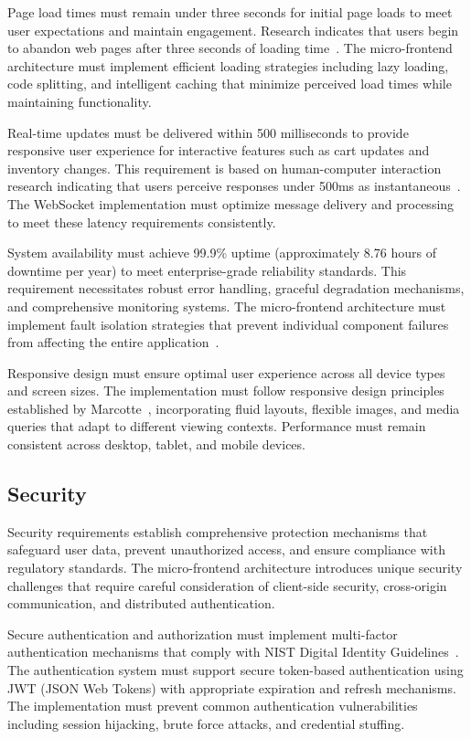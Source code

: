 \documentclass[12pt,a4paper]{report}
\begin{document}
Page load times must remain under three seconds for initial page loads to meet user expectations and maintain engagement. Research indicates that users begin to abandon web pages after three seconds of loading time~\cite{nielsen2012ecommerce}. The micro-frontend architecture must implement efficient loading strategies including lazy loading, code splitting, and intelligent caching that minimize perceived load times while maintaining functionality.

Real-time updates must be delivered within 500 milliseconds to provide responsive user experience for interactive features such as cart updates and inventory changes. This requirement is based on human-computer interaction research indicating that users perceive responses under 500ms as instantaneous~\cite{miller1968response}. The WebSocket implementation must optimize message delivery and processing to meet these latency requirements consistently.

System availability must achieve 99.9\% uptime (approximately 8.76 hours of downtime per year) to meet enterprise-grade reliability standards. This requirement necessitates robust error handling, graceful degradation mechanisms, and comprehensive monitoring systems. The micro-frontend architecture must implement fault isolation strategies that prevent individual component failures from affecting the entire application~\cite{avizienis2004basic}.

Responsive design must ensure optimal user experience across all device types and screen sizes. The implementation must follow responsive design principles established by Marcotte~\cite{marcotte2010responsive}, incorporating fluid layouts, flexible images, and media queries that adapt to different viewing contexts. Performance must remain consistent across desktop, tablet, and mobile devices.

\subsection{Security}

Security requirements establish comprehensive protection mechanisms that safeguard user data, prevent unauthorized access, and ensure compliance with regulatory standards. The micro-frontend architecture introduces unique security challenges that require careful consideration of client-side security, cross-origin communication, and distributed authentication.

Secure authentication and authorization must implement multi-factor authentication mechanisms that comply with NIST Digital Identity Guidelines~\cite{nist2017digital}. The authentication system must support secure token-based authentication using JWT (JSON Web Tokens) with appropriate expiration and refresh mechanisms. The implementation must prevent common authentication vulnerabilities including session hijacking, brute force attacks, and credential stuffing.
\end{document}
